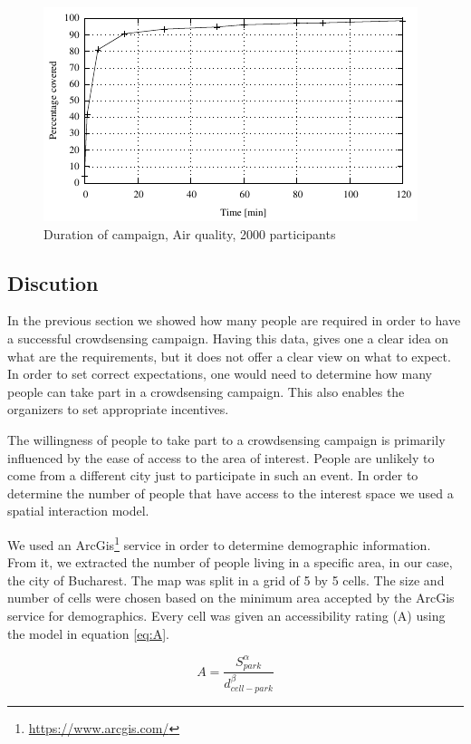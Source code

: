 \begin{figure}
    \centering
    \includegraphics{src/gnuplot/time.pdf}
    \caption{Duration of campaign, Air quality, 2000 participants}
    \label{fig:time}
\end{figure}


\subsection{Discution}
\label{sec:res-crowd-discution}

In the previous section we showed how many people are required in order to have a successful crowdsensing campaign. Having this data, gives one a clear idea on what are the requirements, but it does not offer a clear view on what to expect. In order to set correct expectations, one would need to determine how many people can take part in a crowdsensing campaign. This also enables the organizers to set appropriate incentives.

The willingness of people to take part to a crowdsensing campaign is primarily influenced by the ease of access to the area of interest. People are unlikely to come from a different city just to participate in such an event. In order to determine the number of people that have access to the interest space we used a spatial interaction model.

We used an ArcGis\footnote{\url{https://www.arcgis.com/}} service in order to determine demographic information. From it, we extracted the number of people living in a specific area, in our case, the city of Bucharest. The map was split in a grid of 5 by 5 cells. The size and number of cells were chosen based on the minimum area accepted by the ArcGis service for demographics. Every cell was given an accessibility rating (A) using the model in equation \ref{eq:A}.

\begin{equation} 
A =  \frac{S_{park}^\alpha}{d_{cell-park}^\beta } 
\label{eq:A}
\end{equation}

